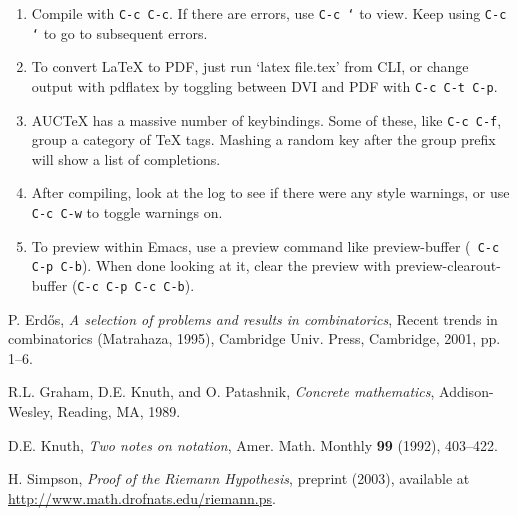 \documentclass[a4paper,12pt]{article}
\begin{document}
\begin{enumerate}
\item Compile with \texttt{C-c C-c}.  If there are errors, use \texttt{C-c `}
  to view.  Keep using \texttt{C-c `} to go to subsequent errors.
\item To convert \LaTeX{} to PDF, just run `latex file.tex' from CLI, or change
  output with pdflatex by toggling between DVI and PDF with \texttt{C-c C-t
    C-p}.
\item AUCTeX has a massive number of keybindings.  Some of these, like
  \texttt{C-c C-f}, group a category of TeX tags.  Mashing a random key after
  the group prefix will show a list of completions.
\item After compiling, look at the log to see if there were any style warnings,
  or use \texttt{C-c C-w} to toggle warnings on.
\item To preview within Emacs, use a preview command like preview-buffer ({\tt
    C-c C-p C-b}).  When done looking at it, clear the preview with
  preview-clearout-buffer ({\tt C-c C-p C-c C-b}).
\end{enumerate}

\begin{thebibliography}{9}

 P. Erd\H os, \emph{A selection of problems and results in
    combinatorics}, Recent trends in combinatorics (Matrahaza, 1995), Cambridge
  Univ. Press, Cambridge, 2001, pp. 1--6.

 R.L. Graham, D.E. Knuth, and O. Patashnik,
  \emph{Concrete mathematics}, Addison-Wesley, Reading, MA, 1989.

 D.E. Knuth, \emph{Two notes on notation}, Amer.
  Math. Monthly \textbf{99} (1992), 403--422.

 H. Simpson, \emph{Proof of the Riemann Hypothesis}, preprint
  (2003), available at \url{http://www.math.drofnats.edu/riemann.ps}.

\end{thebibliography}
\end{document}
